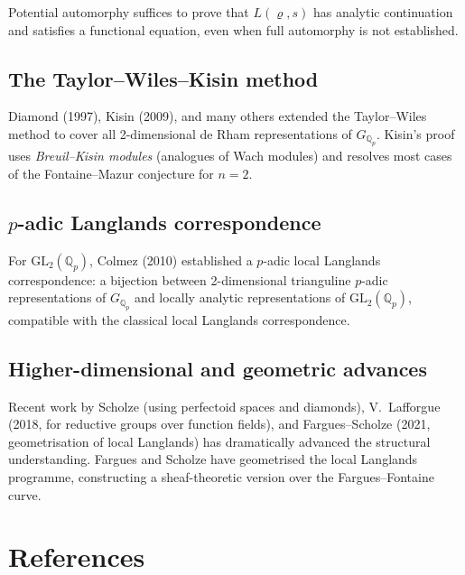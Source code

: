\documentclass[a4paper,12pt]{amsart}
\theoremstyle{definition}
\theoremstyle{remark}
\newcommand{\Q}{\mathbb{Q}}
\newcommand{\GL}{\mathrm{GL}}
\begin{document}
Potential automorphy suffices to prove that $L(\varrho, s)$ has analytic continuation
and satisfies a functional equation, even when full automorphy is not established.

\subsection{The Taylor--Wiles--Kisin method}

Diamond (1997), Kisin (2009), and many others extended the Taylor--Wiles method to
cover all 2-dimensional de Rham representations of $G_{\Q_p}$. Kisin's proof uses
\emph{Breuil--Kisin modules} (analogues of Wach modules) and resolves most cases of
the Fontaine--Mazur conjecture for $n = 2$.

\subsection{$p$-adic Langlands correspondence}

For $\GL_2(\Q_p)$, Colmez (2010) established a $p$-adic local Langlands correspondence:
a bijection between 2-dimensional trianguline $p$-adic representations of $G_{\Q_p}$
and locally analytic representations of $\GL_2(\Q_p)$, compatible with the classical
local Langlands correspondence.

\subsection{Higher-dimensional and geometric advances}

Recent work by Scholze (using perfectoid spaces and diamonds), V.~Lafforgue (2018, for
reductive groups over function fields), and Fargues--Scholze (2021, geometrisation of
local Langlands) has dramatically advanced the structural understanding. Fargues and
Scholze have geometrised the local Langlands programme, constructing a sheaf-theoretic
version over the Fargues--Fontaine curve.

\section{References}
\end{document}
